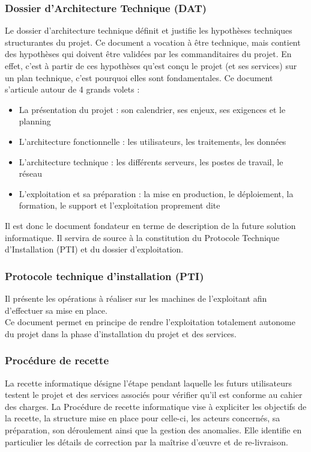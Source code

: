 \subsubsection{Dossier d'Architecture Technique (DAT)}
Le dossier d'architecture technique définit et justifie les hypothèses techniques structurantes du projet. Ce document a vocation à être technique, mais contient des hypothèses qui doivent être validées par les commanditaires du projet. En effet, c'est à partir de ces hypothèses qu'est conçu le projet (et ses services) sur un plan technique, c'est pourquoi elles sont fondamentales.
Ce document s'articule autour de 4 grands volets :
\begin{itemize}
 \item La présentation du projet : son calendrier, ses enjeux, ses exigences et le planning
 \item L'architecture fonctionnelle : les utilisateurs, les traitements, les données 
 \item L'architecture technique : les différents serveurs, les postes de travail, le réseau
 \item L'exploitation et sa préparation : la mise en production, le déploiement, la formation, le support et l'exploitation proprement dite
\end{itemize}
Il est donc le document fondateur en terme de description de la future solution informatique. Il servira de source à la constitution du Protocole Technique d'Installation (PTI) et du dossier d'exploitation.

\subsubsection{Protocole technique d'installation (PTI)}
Il présente les opérations à réaliser sur les machines de l'exploitant afin d'effectuer sa mise en place.
\\
Ce document permet en principe de rendre l'exploitation totalement autonome du projet dans la phase d'installation du projet et des services.

\subsubsection{Procédure de recette}
La recette informatique désigne l'étape pendant laquelle les futurs utilisateurs testent le projet et des services associés pour vérifier qu'il est conforme au cahier des charges.
La Procédure de recette informatique vise à expliciter les objectifs de la recette, la structure mise en place pour celle-ci, les acteurs concernés, sa préparation, son déroulement ainsi que la gestion des anomalies. Elle identifie en particulier les détails de correction par la maîtrise d'œuvre et de re-livraison.

